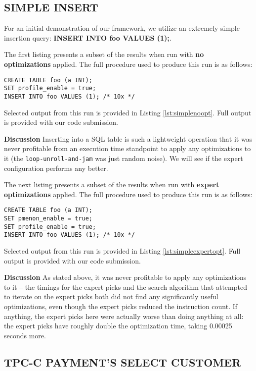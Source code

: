 \documentclass{vldb}
\newcommand{\dbCode}[1]{{\sffamily\small \textbf{#1}}\xspace}
\begin{document}
\subsection{SIMPLE INSERT}

For an initial demonstration of our framework, we utilize an extremely simple insertion query: \dbCode{INSERT INTO foo VALUES (1);}.

The first listing presents a subset of the results when run with \textbf{no optimizations} applied. The full procedure used to produce this run is as follows:
\begin{lstlisting}
CREATE TABLE foo (a INT);
SET profile_enable = true;
INSERT INTO foo VALUES (1); /* 10x */
\end{lstlisting}

Selected output from this run is provided in Listing \ref{lst:simplenoopt}. Full output is provided with our code submission.

\textbf{Discussion} Inserting into a SQL table is such a lightweight operation that it was never profitable from an execution time standpoint to apply any optimizations to it (the \lstinline{loop-unroll-and-jam} was just random noise). We will see if the expert configuration performs any better. \linebreak

The next listing presents a subset of the results when run with \textbf{expert optimizations} applied. The full procedure used to produce this run is as follows:
\begin{lstlisting}
CREATE TABLE foo (a INT);
SET pmenon_enable = true;
SET profile_enable = true;
INSERT INTO foo VALUES (1); /* 10x */
\end{lstlisting}

Selected output from this run is provided in Listing \ref{lst:simpleexpertopt}. Full output is provided with our code submission.

\textbf{Discussion} As stated above, it was never profitable to apply any optimizations to it -- the timings for the expert picks and the search algorithm that attempted to iterate on the expert picks both did not find any significantly useful optimizations, even though the expert picks reduced the instruction count. If anything, the expert picks here were actually worse than doing anything at all: the expert picks have roughly double the optimization time, taking 0.00025 seconds more.

\subsection{TPC-C PAYMENT'S SELECT CUSTOMER}
\end{document}
